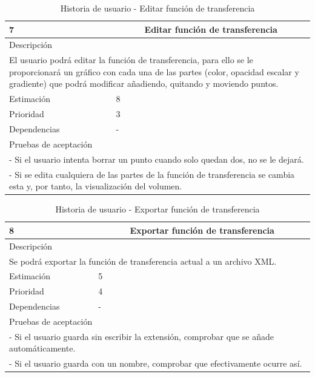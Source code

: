 \begin{table}[H]
	\begin{center}
		\begin{tabular} {|l|c|l|}
			\hline
			7 & \multicolumn{2}{c|}{Editar función de transferencia} \\ \hline \hline
			\multicolumn{3}{|l|}{Descripción} \\ \hline
			\multicolumn{3}{|p{12cm}|}{El usuario podrá editar la función de transferencia, para ello se le proporcionará un gráfico con cada una de las partes (color, opacidad escalar y gradiente) que podrá modificar añadiendo, quitando y moviendo puntos.} \\ \hline
			\multicolumn{2}{|l|}{Estimación} & 8 \\ \hline
			\multicolumn{2}{|l|}{Prioridad} & 3 \\ \hline
			\multicolumn{2}{|l|}{Dependencias} & - \\ \hline
			\multicolumn{3}{|l|}{Pruebas de aceptación} \\ \hline
			\multicolumn{3}{|p{12cm}|}{ - Si el usuario intenta borrar un punto cuando solo quedan dos, no se le dejará.} \\
			\multicolumn{3}{|p{12cm}|}{ - Si se edita cualquiera de las partes de la función de transferencia se cambia esta y, por tanto, la visualización del volumen.} \\ \hline
		\end{tabular}
	\end{center}
	\caption{Historia de usuario - Editar función de transferencia}
	\label{tab:hu_editar_funcion_de_transferencia}
\end{table}

\begin{table}[H]
	\begin{center}
		\begin{tabular} {|l|c|l|}
			\hline
			8 & \multicolumn{2}{c|}{Exportar función de transferencia} \\ \hline \hline
			\multicolumn{3}{|l|}{Descripción} \\ \hline
			\multicolumn{3}{|p{12cm}|}{Se podrá exportar la función de transferencia actual a un archivo XML.} \\ \hline
			\multicolumn{2}{|l|}{Estimación} & 5 \\ \hline
			\multicolumn{2}{|l|}{Prioridad} & 4 \\ \hline
			\multicolumn{2}{|l|}{Dependencias} & - \\ \hline
			\multicolumn{3}{|l|}{Pruebas de aceptación} \\ \hline
			\multicolumn{3}{|p{12cm}|}{ - Si el usuario guarda sin escribir la extensión, comprobar que se añade automáticamente.} \\
			\multicolumn{3}{|p{12cm}|}{ - Si el usuario guarda con un nombre, comprobar que efectivamente ocurre así.} \\ \hline
		\end{tabular}
	\end{center}
	\caption{Historia de usuario - Exportar función de transferencia}
	\label{tab:hu_exportar_funcion_de_transferencia}
\end{table}

